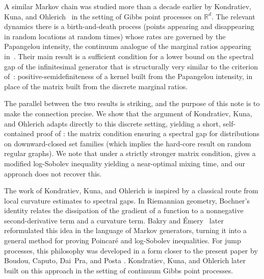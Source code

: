 \documentclass[10pt,a4paper]{amsart}
\begin{document}
	
	
	
	A similar Markov chain 
	was studied more than a decade earlier by Kondratiev, Kuna, and Ohlerich~\cite{kondratiev2013spectral} in the setting of Gibbs point processes on $\mathbb{R}^d$. The relevant 
	dynamics there is a birth-and-death process (points appearing and disappearing in random locations at random times) whose rates are governed by the Papangelou intensity, the continuum analogue of the marginal ratios appearing in~\cite{chen2025rapid}. Their main result is a sufficient condition for a lower bound on the
	spectral gap of the infinitesimal generator that is structurally very similar to the criterion of~\cite{chen2025rapid}: positive-semidefiniteness of a kernel built from the Papangelou intensity, in place of the matrix built 
	from the discrete marginal ratios.
	
	
	The parallel between the two results is striking, and the purpose of this note is to make the connection precise.  
	We show that the argument of Kondratiev, Kuna, and Ohlerich adapts directly to this discrete setting, yielding a short, self-contained proof of \cite[Theorem~1.9]{chen2025rapid}: the matrix condition ensuring a spectral gap for distributions on downward-closed set families (which implies the hard-core result on random regular graphs).
	We note that under a strictly stronger matrix condition, \cite[Theorem~1.8]{chen2025rapid} gives a modified log-Sobolev inequality yielding a near-optimal mixing time, and our approach does not recover this.
	
	
	
	
	The work of Kondratiev, Kuna, and Ohlerich is inspired by a classical route from local curvature estimates to spectral gaps.
	In Riemannian geometry, Bochner's identity relates the dissipation of the
	gradient of a function to a nonnegative second-derivative term and a curvature
	term.  Bakry and \'Emery~\cite{bakry2006diffusions} later reformulated this idea in the language of
	Markov generators, turning it into a general method for proving Poincar\'e and
	log-Sobolev inequalities.  For jump processes, this philosophy was developed in a form closer to the
	present paper by Boudou, Caputo, Dai~Pra, and Posta
	\cite{boudou2006spectral}.  Kondratiev, Kuna, and Ohlerich
	\cite{kondratiev2013spectral} later built on this approach in the setting of continuum
	Gibbs point processes.  
	
\end{document}
